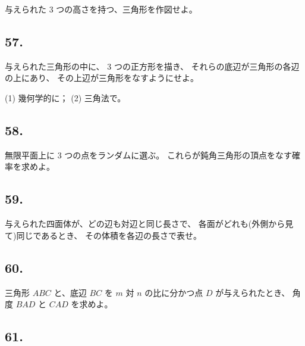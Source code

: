 与えられた 3 つの高さを持つ、三角形を作図せよ。

\begin{flushright}
[27/6/84]
\end{flushright}

\subsection*{57.}

与えられた三角形の中に、 3 つの正方形を描き、
それらの底辺が三角形の各辺の上にあり、
その上辺が三角形をなすようにせよ。

(1) 幾何学的に； (2) 三角法で。

\begin{flushright}
[27/1/91]
\end{flushright}

\subsection*{58.}

無限平面上に 3 つの点をランダムに選ぶ。
これらが鈍角三角形の頂点をなす確率を求めよ。

\begin{flushright}
[20/1/84]
\end{flushright}

\subsection*{59.}

与えられた四面体が、どの辺も対辺と同じ長さで、
各面がどれも(外側から見て)同じであるとき、
その体積を各辺の長さで表せ。

\begin{flushright}
[8/90]
\end{flushright}

\subsection*{60.}

三角形 $ABC$ と、底辺 $BC$ を $m$ 対 $n$ の比に分かつ点 $D$ が与えられたとき、
角度 $BAD$ と $CAD$ を求めよ。

\begin{flushright}
[21/3/90]
\end{flushright}

\subsection*{61.}

